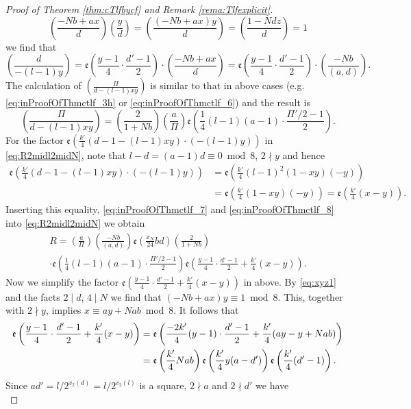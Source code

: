 \documentclass[12pt]{amsart}
\numberwithin{equation}{section}
\theoremstyle{plain}
\theoremstyle{definition}
\theoremstyle{remark}
\newcommand\legendre[2]{\genfrac{(}{)}{}{}{#1}{#2}}
\newcommand\etp[1]{\mathfrak{e}\left(#1\right)}
\begin{document}
\begin{proof}[Proof of Theorem \ref{thm:cTlfbycf} and Remark \ref{rema:Tlfexplicit}]
\begin{equation*}
\legendre{-Nb+ax}{d}\legendre{y}{d}=\legendre{(-Nb+ax)y}{d}=\legendre{1-Ndz}{d}=1
\end{equation*}
we find that
\begin{equation}
\label{eq:inProofOfThmctlf_7}
\legendre{d}{-(l-1)y}=\etp{\frac{y-1}{4}\cdot\frac{d'-1}{2}}\cdot\legendre{-Nb+ax}{d}=\etp{\frac{y-1}{4}\cdot\frac{d'-1}{2}}\cdot\legendre{-Nb}{(a,d)}.
\end{equation}
The calculation of $\legendre{\varPi}{d-(l-1)xy}$ is similar to that in above cases (e.g. \eqref{eq:inProofOfThmctlf_3h} or \eqref{eq:inProofOfThmctlf_6}) and the result is
\begin{equation}
\label{eq:inProofOfThmctlf_8}
\legendre{\varPi}{d-(l-1)xy}=\legendre{2}{1+Nb}\legendre{a}{\varPi}\etp{\frac{1}{4}(l-1)(a-1)\cdot\frac{\varPi'/2-1}{2}}.
\end{equation}
For the factor $\etp{\frac{k'}{4}(d-1-(l-1)xy)\cdot(-(l-1)y)}$ in \eqref{eq:R2midl2midN}, note that $l-d=(a-1)d\equiv0\bmod{8}$, $2\nmid y$ and hence
\begin{align*}
\etp{\frac{k'}{4}(d-1-(l-1)xy)\cdot(-(l-1)y)}&=\etp{\frac{k'}{4}(l-1)^2(1-xy)(-y)}\\
&=\etp{\frac{k'}{4}(1-xy)(-y)}=\etp{\frac{k'}{4}(x-y)}.
\end{align*}
Inserting this equality, \eqref{eq:inProofOfThmctlf_7} and \eqref{eq:inProofOfThmctlf_8} into \eqref{eq:R2midl2midN} we obtain
\begin{multline}
\label{eq:inProofOfThmctlf_8hh}
R=\legendre{a}{\varPi}\legendre{-Nb}{(a,d)}\etp{\frac{x_N}{24}bd}\legendre{2}{1+Nb}\\
\cdot\etp{\frac{1}{4}(l-1)(a-1)\cdot\frac{\varPi'/2-1}{2}}\etp{\frac{y-1}{4}\cdot\frac{d'-1}{2}+\frac{k'}{4}(x-y)}.
\end{multline}
Now we simplify the factor $\etp{\frac{y-1}{4}\cdot\frac{d'-1}{2}+\frac{k'}{4}(x-y)}$ in above. By \eqref{eq:xyz1} and the facts $2\mid d$, $4\mid N$ we find that $(-Nb+ax)y\equiv1\bmod{8}$. This, together with $2\nmid y$, implies $x\equiv ay+Nab\bmod{8}$. It follows that
\begin{align}
\etp{\frac{y-1}{4}\cdot\frac{d'-1}{2}+\frac{k'}{4}(x-y)}&=\etp{\frac{-2k'}{4}(y-1)\cdot\frac{d'-1}{2}+\frac{k'}{4}(ay-y+Nab)}\notag\\
&=\etp{\frac{k'}{4}Nab}\etp{\frac{k'}{4}y(a-d')}\etp{\frac{k'}{4}(d'-1)}.\label{eq:inProofOfThmctlf_8h}
\end{align}
Since $ad'=l/2^{v_2(d)}=l/2^{v_2(l)}$ is a square, $2\nmid a$ and $2\nmid d'$ we have
\begin{equation}

\end{equation}
\end{proof}
\end{document}
